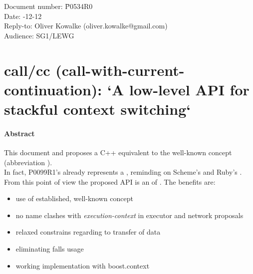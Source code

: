 \documentclass[fontsize=10pt,paper=A4,pagesize,DIV=15]{scrartcl}
\begin{document}
\small
\begin{tabbing}
    Document number: \= P0534R0\\
    Date:            -12-12\\
    Reply-to:        \> Oliver Kowalke (oliver.kowalke@gmail.com)\\
    Audience:        \> SG1/LEWG\\
\end{tabbing}

\section*{call/cc (call-with-current-continuation): `A low-level API for stackful context switching`}


\tableofcontents


\paragraph*{Abstract}
This document  and proposes a C++
equivalent to the well-known concept \callcc (abbreviation \cc).\\
In fact, P0099R1's \ectx already represents a ,
reminding on Scheme's\cite{schemecallcc} and Ruby's\cite{rubycallcc} \cc.
From this point of view the proposed API is an  of \ectx. The
benefits are:
\begin{itemize}
    \item   use of established, well-known concept
    \item   no name clashes with \emph{execution-context} in
            executor and network proposals
    \item   relaxed constrains regarding to transfer of data
    \item   eliminating falls usage
    \item   working implementation with boost.context\cite{bcontext}
\end{itemize}






%






\end{document}
